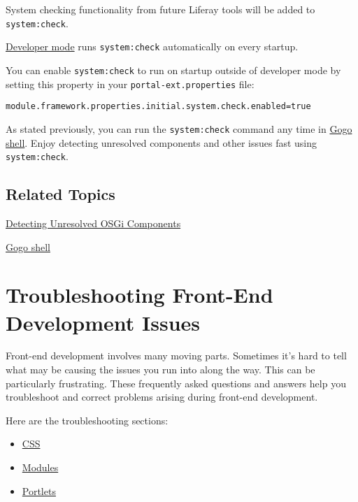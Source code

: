 System checking functionality from future Liferay tools will be added to
\texttt{system:check}.

\href{/docs/7-2/frameworks/-/knowledge_base/f/using-developer-mode-with-themes}{Developer
mode} runs \texttt{system:check} automatically on every startup.

You can enable \texttt{system:check} to run on startup outside of
developer mode by setting this property in your
\texttt{portal-ext.properties} file:

\begin{verbatim}
module.framework.properties.initial.system.check.enabled=true
\end{verbatim}

As stated previously, you can run the \texttt{system:check} command any
time in
\href{/docs/7-2/customization/-/knowledge_base/c/using-the-felix-gogo-shell}{Gogo
shell}. Enjoy detecting unresolved components and other issues fast
using \texttt{system:check}.

\section{Related Topics}\label{related-topics-36}

\href{/docs/7-2/appdev/-/knowledge_base/a/detecting-unresolved-osgi-components}{Detecting
Unresolved OSGi Components}

\href{/docs/7-2/customization/-/knowledge_base/c/using-the-felix-gogo-shell}{Gogo
shell}

\chapter{Troubleshooting Front-End Development
Issues}\label{troubleshooting-front-end-development-issues}

Front-end development involves many moving parts. Sometimes it's hard to
tell what may be causing the issues you run into along the way. This can
be particularly frustrating. These frequently asked questions and
answers help you troubleshoot and correct problems arising during
front-end development.

Here are the troubleshooting sections:

\begin{itemize}
\tightlist
\item
  \hyperref[css]{CSS}
\item
  \hyperref[modules]{Modules}
\item
  \hyperref[portlets]{Portlets}
\end{itemize}

